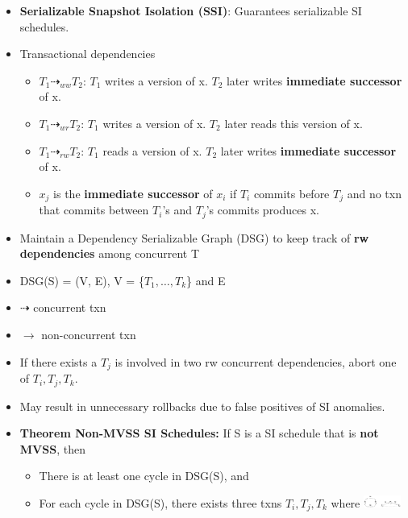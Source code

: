 \documentclass[8pt, landscape]{extarticle}
\begin{document}
\begin{multicols*}{4}
  \begin{itemize}
    \item \textbf{Serializable Snapshot Isolation (SSI)}: Guarantees serializable SI schedules.
    \item Transactional dependencies
    \begin{itemize}
      \item $T_1 \dashrightarrow_{ww} T_2$: $T_1$ writes a version of x. $T_2$ later writes \textbf{immediate successor} of x.
      \item $T_1 \dashrightarrow_{wr} T_2$: $T_1$ writes a version of x. $T_2$ later reads this version of x.
      \item $T_1 \dashrightarrow_{rw} T_2$: $T_1$ reads a version of x. $T_2$ later writes \textbf{immediate successor} of x.
      \item $x_j$ is the \textbf{immediate successor} of $x_i$ if $T_i$ commits before $T_j$ and no txn that commits between $T_i$'s and $T_j$'s commits produces x.
    \end{itemize}
    \item Maintain a Dependency Serializable Graph (DSG) to keep track of \textbf{rw dependencies} among concurrent T
    \item DSG(S) = (V, E), V = \{$T_1, \dots, T_k$\} and E
    \item $\dashrightarrow$ concurrent txn
    \item $\rightarrow$ non-concurrent txn
    \item If there exists a $T_j$ is involved in two rw concurrent dependencies, abort one of $T_i, T_j, T_k$.
    \item May result in unnecessary rollbacks due to false positives of SI anomalies.
    \item \textbf{Theorem Non-MVSS SI Schedules:} If S is a SI schedule that is \textbf{not MVSS}, then
    \begin{itemize}
      \item There is at least one cycle in DSG(S), and
      \item For each cycle in DSG(S), there exists three txns $T_i, T_j, T_k$ where
      \includegraphics[width=0.1\textwidth]{cs3223-ssi-theorem.png}
    \end{itemize}
  \end{itemize}


\end{multicols*}
\end{document}
